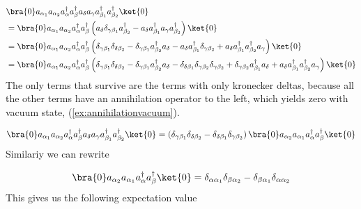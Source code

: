 \begin{align}
 &\bra{0} a_{\alpha_1} a_{\alpha_2} a_{\alpha}^\dagger a_{\beta}^\dagger a_{\delta} a_{\gamma} a_{\beta_1}^\dagger a_{\beta_2}^\dagger \ket{0} \nonumber \\
&= \bra{0} a_{\alpha_1} a_{\alpha_2} a_{\alpha}^\dagger a_{\beta}^\dagger \left( a_{\delta} \delta_{\gamma\beta_1} a_{\beta_2}^{\dagger} -  a_\delta a_{\beta_1}^\dagger a_\gamma a_{\beta_2}^\dagger \right) \ket{0} \\ 
&= \bra{0} a_{\alpha_1} a_{\alpha_2} a_{\alpha}^\dagger a_{\beta}^\dagger \left( \delta_{\gamma\beta_1}\delta_{\delta \beta_2} - \delta_{\gamma \beta_1} a_{\beta_2}^{\dagger} a_{\delta} - a_{\delta} a_{\beta_1}^{\dagger} \delta_{\gamma \beta_2} + a_\delta a_{\beta_1}^{\dagger}a_{\beta_2}^{\dagger} a_\gamma \right) \ket{0}\\
&=\bra{0} a_{\alpha_1} a_{\alpha_2} a_{\alpha}^\dagger a_{\beta}^\dagger \left(\delta_{\gamma\beta_1}\delta_{\delta \beta_2} - \delta_{\gamma \beta_1} a_{\beta_2}^{\dagger} a_{\delta} - \delta_{\delta\beta_1}\delta_{\gamma\beta_2} \delta_{\gamma \beta_2} + \delta_{\gamma\beta_2}a_{\beta_1}^{\dagger}a_\delta + a_\delta a_{\beta_1}^{\dagger}a_{\beta_2}^{\dagger} a_\gamma \right) \ket{0}
\end{align}
% 
The only terms that survive are the terms with only kronecker deltas, because all the other terms have an annihilation operator to the left, which yields zero with vacuum state, (\ref{ex:annihilationvacuum}).

\begin{equation}
\bra{0} a_{\alpha_1} a_{\alpha_2} a_{\alpha}^\dagger a_{\beta}^\dagger a_{\delta} a_{\gamma} a_{\beta_1}^\dagger a_{\beta_2}^\dagger \ket{0} = \left(\delta_{\gamma\beta_1}\delta_{\delta\beta_2} - \delta_{\delta\beta_1}\delta_{\gamma\beta_2}\right)\bra{0} a_{\alpha_2} a_{\alpha_1} a^{\dagger}_{\alpha} a^{\dagger}_{\beta} \ket{0}
\label{eq:vacuumexpectation}
\end{equation}
%
Similariy we can rewrite 

\begin{equation}
\bra{0} a_{\alpha_2}a_{\alpha_1}a_{\alpha}^{\dagger}a_{\beta}^{\dagger} \ket{0} = \delta_{\alpha \alpha_1}\delta_{\beta \alpha_2} - \delta_{\beta \alpha_1}\delta_{\alpha \alpha_2}
 \label{eq:vacuumexpectation2}
\end{equation}
%
This gives us the following expectation value

